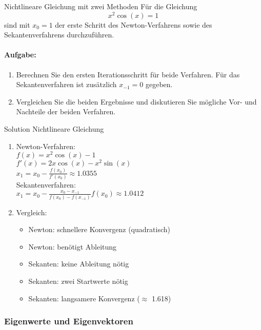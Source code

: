 \begin{example2}{Nichtlineare Gleichung mit zwei Methoden}
Für die Gleichung
$$x^2\cos(x) = 1$$
sind mit $x_0 = 1$ der erste Schritt des Newton-Verfahrens sowie des Sekantenverfahrens durchzuführen.

\paragraph{Aufgabe:}
\begin{enumerate}
    \item Berechnen Sie den ersten Iterationsschritt für beide Verfahren. Für das Sekantenverfahren ist zusätzlich $x_{-1} = 0$ gegeben.
    
    \item Vergleichen Sie die beiden Ergebnisse und diskutieren Sie mögliche Vor- und Nachteile der beiden Verfahren.
\end{enumerate}
\end{example2}

\begin{KR}{Solution Nichtlineare Gleichung}
\begin{enumerate}
    \item Newton-Verfahren:\\
    $f(x) = x^2\cos(x) - 1$\\
    $f'(x) = 2x\cos(x) - x^2\sin(x)$\\
    $x_1 = x_0 - \frac{f(x_0)}{f'(x_0)} \approx 1.0355$\\
    
    Sekantenverfahren:\\
    $x_1 = x_0 - \frac{x_0-x_{-1}}{f(x_0)-f(x_{-1})}f(x_0) \approx 1.0412$
    
    \item Vergleich:
    \begin{itemize}
        \item Newton: schnellere Konvergenz (quadratisch)
        \item Newton: benötigt Ableitung
        \item Sekanten: keine Ableitung nötig
        \item Sekanten: zwei Startwerte nötig
        \item Sekanten: langsamere Konvergenz ($\approx$ 1.618)
    \end{itemize}
\end{enumerate}
\end{KR}

\subsubsection{Eigenwerte und Eigenvektoren}

